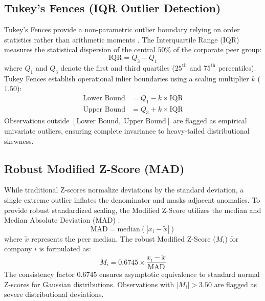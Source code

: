 \subsection{Tukey's Fences (IQR Outlier Detection)}
Tukey's Fences provide a non-parametric outlier boundary relying on order statistics rather than arithmetic moments \cite{tukey1977exploratory}. The Interquartile Range ($\text{IQR}$) measures the statistical dispersion of the central $50\%$ of the corporate peer group:
\begin{equation}
    \text{IQR} = Q_3 - Q_1
\end{equation}
where $Q_1$ and $Q_3$ denote the first and third quartiles ($25^{\text{th}}$ and $75^{\text{th}}$ percentiles). Tukey Fences establish operational inlier boundaries using a scaling multiplier $k$ ($1.50$):
\begin{align}
    \text{Lower Bound} &= Q_1 - k \times \text{IQR} \\
    \text{Upper Bound} &= Q_3 + k \times \text{IQR}
\end{align}
Observations outside $[\text{Lower Bound}, \; \text{Upper Bound}]$ are flagged as empirical univariate outliers, ensuring complete invariance to heavy-tailed distributional skewness.

\subsection{Robust Modified Z-Score (MAD)}
While traditional Z-scores normalize deviations by the standard deviation, a single extreme outlier inflates the denominator and masks adjacent anomalies. To provide robust standardized scaling, the Modified Z-Score utilizes the median and Median Absolute Deviation ($\text{MAD}$) \cite{iglewicz1993how}:
\begin{equation}
    \text{MAD} = \text{median}\left( |x_i - \tilde{x}| \right)
\end{equation}
where $\tilde{x}$ represents the peer median. The robust Modified Z-Score ($M_i$) for company $i$ is formulated as:
\begin{equation}
    M_i = 0.6745 \times \frac{x_i - \tilde{x}}{\text{MAD}}
\end{equation}
The consistency factor $0.6745$ ensures asymptotic equivalence to standard normal Z-scores for Gaussian distributions. Observations with $|M_i| > 3.50$ are flagged as severe distributional deviations.

\clearpage

